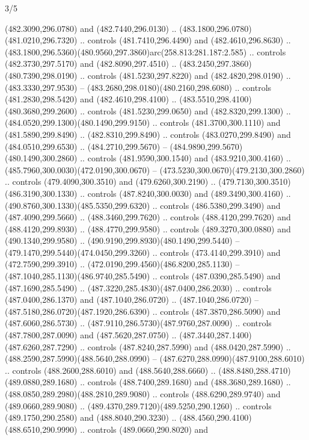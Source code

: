 \begin{flagdescription}{3/5}
\begin{scope}[shift={(0.5\flaglength,0.5\flagwidth)},scale=\flagwidth/1075]
\begin{scope}[y=0.80pt, x=0.80pt, yscale=-2.37, xscale=2.37,xshift=-402,yshift=-230.4]
  (482.3090,296.0780) and (482.7440,296.0130) ..
  (483.1800,296.0780)(481.0210,296.7320) .. controls (481.7410,296.4490) and
  (482.4610,296.8630) ..
  (483.1800,296.5360)(480.9560,297.3860)arc(258.813:281.187:2.585) .. controls
  (482.3730,297.5170) and (482.8090,297.4510) ..
  (483.2450,297.3860)(480.7390,298.0190) .. controls (481.5230,297.8220) and
  (482.4820,298.0190) .. (483.3330,297.9530) --
  (483.2680,298.0180)(480.2160,298.6080) .. controls (481.2830,298.5420) and
  (482.4610,298.4100) .. (483.5510,298.4100)(480.3680,299.2600) .. controls
  (481.5230,299.0650) and (482.8320,299.1300) ..
  (484.0520,299.1300)(480.1490,299.9150) .. controls (481.3700,300.1110) and
  (481.5890,299.8490) .. (482.8310,299.8490) .. controls (483.0270,299.8490) and
  (484.0510,299.6530) .. (484.2710,299.5670) --
  (484.9890,299.5670)(480.1490,300.2860) .. controls (481.9590,300.1540) and
  (483.9210,300.4160) .. (485.7960,300.0030)(472.0190,300.0670) --
  (473.5230,300.0670)(479.2130,300.2860) .. controls (479.4090,300.3510) and
  (479.6260,300.2190) .. (479.7130,300.3510)(486.3190,300.1330) .. controls
  (487.8240,300.0030) and (489.3490,300.4160) ..
  (490.8760,300.1330)(485.5350,299.6320) .. controls (486.5380,299.3490) and
  (487.4090,299.5660) .. (488.3460,299.7620) .. controls (488.4120,299.7620) and
  (488.4120,299.8930) .. (488.4770,299.9580) .. controls (489.3270,300.0880) and
  (490.1340,299.9580) .. (490.9190,299.8930)(480.1490,299.5440) --
  (479.1470,299.5440)(474.0450,299.3260) .. controls (473.4140,299.3910) and
  (472.7590,299.3910) .. (472.0190,299.4560)(486.8200,285.1130) --
  (487.1040,285.1130)(486.9740,285.5490) .. controls (487.0390,285.5490) and
  (487.1690,285.5490) .. (487.3220,285.4830)(487.0400,286.2030) .. controls
  (487.0400,286.1370) and (487.1040,286.0720) .. (487.1040,286.0720) --
  (487.5180,286.0720)(487.1920,286.6390) .. controls (487.3870,286.5090) and
  (487.6060,286.5730) .. (487.9110,286.5730)(487.9760,287.0090) .. controls
  (487.7800,287.0090) and (487.5620,287.0750) ..
  (487.3440,287.1400)(487.6260,287.7290) .. controls (487.8240,287.5990) and
  (488.0420,287.5990) .. (488.2590,287.5990)(488.5640,288.0990) --
  (487.6270,288.0990)(487.9100,288.6010) .. controls (488.2600,288.6010) and
  (488.5640,288.6660) .. (488.8480,288.4710)(489.0880,289.1680) .. controls
  (488.7400,289.1680) and (488.3680,289.1680) ..
  (488.0850,289.2980)(488.2810,289.9080) .. controls (488.6290,289.9740) and
  (489.0660,289.9080) .. (489.4370,289.7120)(489.5250,290.1260) .. controls
  (489.1750,290.2580) and (488.8040,290.3230) ..
  (488.4560,290.4100)(488.6510,290.9990) .. controls (489.0660,290.8020) and

\end{scope}
\end{scope}
\end{flagdescription}
